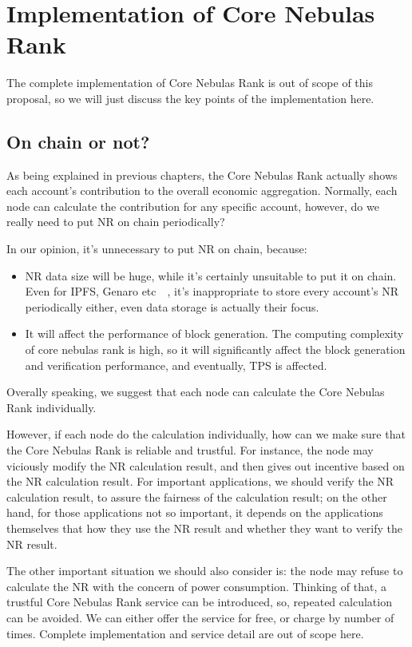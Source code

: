 \section{Implementation of Core Nebulas Rank}
The complete implementation of Core Nebulas Rank is out of scope of this proposal, so we will just discuss the key points of the implementation here.

\subsection{On chain or not? \label{sec:onchain}}
As being explained in previous chapters, the Core Nebulas Rank actually shows each account’s contribution to the overall economic aggregation. Normally, each node can calculate the contribution for any specific account, however, do we really need to put NR on chain periodically?

In our opinion, it’s unnecessary to put NR on chain, because:
\begin{itemize}
\item NR data size will be huge, while it’s certainly unsuitable to put it on chain. Even for  IPFS, Genaro etc~\cite{IPFS}~\cite{Genaro}, it’s inappropriate to store every account’s NR periodically either, even data storage is actually their focus. 
\item It will affect the performance of block generation. The computing complexity of core nebulas rank is high, so it will significantly affect the block generation and verification performance, and eventually, TPS is affected.
\end{itemize}
\noindent Overally speaking, we suggest that each node can calculate the Core Nebulas Rank individually.

However, if each node do the calculation individually, how can we make sure that the Core Nebulas Rank is reliable and trustful. For instance, the node may viciously modify the NR calculation result, and then gives out incentive based on the NR calculation result. For important applications, we should verify the NR calculation result, to assure the fairness of the calculation result; on the other hand, for those applications not so important, it depends on the applications themselves that how they use the NR result and whether they want to verify the NR result.

The other important situation we should also consider is: the node may refuse to calculate the NR with the concern of power consumption. Thinking of that, a trustful Core Nebulas Rank service can be introduced, so, repeated calculation can be avoided. We can either offer the service for free, or charge by number of times. Complete implementation and service detail are out of scope here.

